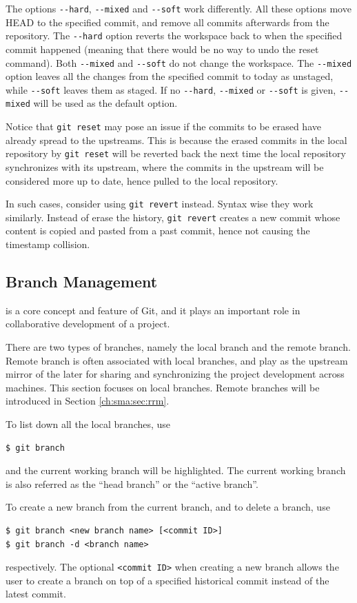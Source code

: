 The options \verb|--hard|, \verb|--mixed| and \verb|--soft| work differently. All these options move HEAD to the specified commit, and remove all commits afterwards from the repository. The \verb|--hard| option reverts the workspace back to when the specified commit happened (meaning that there would be no way to undo the reset command). Both \verb|--mixed| and \verb|--soft| do not change the workspace. The \verb|--mixed| option leaves all the changes from the specified commit to today as unstaged, while \verb|--soft| leaves them as staged. If no \verb|--hard|, \verb|--mixed| or \verb|--soft| is given, \verb|--mixed| will be used as the default option.

Notice that \verb|git reset| may pose an issue if the commits to be erased have already spread to the upstreams. This is because the erased commits in the local repository by \verb|git reset| will be reverted back the next time the local repository synchronizes with its upstream, where the commits in the upstream will be considered more up to date, hence pulled to the local repository.

In such cases, consider using \verb|git revert| instead. Syntax wise they work similarly. Instead of erase the history, \verb|git revert| creates a new commit whose content is copied and pasted from a past commit, hence not causing the timestamp collision.

\subsection{Branch Management}

 is a core concept and feature of Git, and it plays an important role in collaborative development of a project. 

There are two types of branches, namely the local branch and the remote branch. Remote branch is often associated with local branches, and play as the upstream mirror of the later for sharing and synchronizing the project development across machines. This section focuses on local branches. Remote branches will be introduced in Section \ref{ch:sma:sec:rrm}.

To list down all the local branches, use
\begin{lstlisting}
$ git branch
\end{lstlisting}
and the current working branch will be highlighted. The current working branch is also referred as the ``head branch'' or the ``active branch''.

To create a new branch from the current branch, and to delete a branch, use
\begin{lstlisting}
$ git branch <new branch name> [<commit ID>]
$ git branch -d <branch name>
\end{lstlisting}
respectively. The optional \verb|<commit ID>| when creating a new branch allows the user to create a branch on top of a specified historical commit instead of the latest commit.

